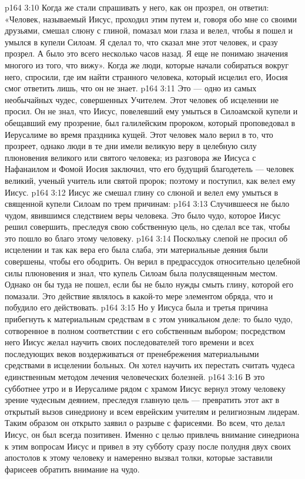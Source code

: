 \vs p164 3:10 Когда же стали спрашивать у него, как он прозрел, он ответил: «Человек, называемый Иисус, проходил этим путем и, говоря обо мне со своими друзьями, смешал слюну с глиной, помазал мои глаза и велел, чтобы я пошел и умылся в купели Силоам. Я сделал то, что сказал мне этот человек, и сразу прозрел. А было это всего несколько часов назад. Я еще не понимаю значения многого из того, что вижу». Когда же люди, которые начали собираться вокруг него, спросили, где им найти странного человека, который исцелил его, Иосия смог ответить лишь, что он не знает.
\vs p164 3:11 \pc Это --- одно из самых необычайных чудес, совершенных Учителем. Этот человек об исцелении не просил. Он не знал, что Иисус, повелевший ему умыться в Силоамской купели и обещавший ему прозрение, был галилейским пророком, который проповедовал в Иерусалиме во время праздника кущей. Этот человек мало верил в то, что прозреет, однако люди в те дни имели великую веру в целебную силу плюновения великого или святого человека; из разговора же Иисуса с Нафанаилом и Фомой Иосия заключил, что его будущий благодетель --- человек великий, ученый учитель или святой пророк; поэтому и поступил, как велел ему Иисус.
\vs p164 3:12 Иисус же смешал глину со слюной и велел ему умыться в священной купели Силоам по трем причинам:
\vs p164 3:13 \bibnobreakspace Случившееся не было чудом, явившимся следствием веры человека. Это было чудо, которое Иисус решил совершить, преследуя свою собственную цель, но сделал все так, чтобы это пошло во благо этому человеку.
\vs p164 3:14 \pc {}\bibnobreakspace Поскольку слепой не просил об исцелении и так как вера его была слаба, эти материальные деяния были совершены, чтобы его ободрить. Он верил в предрассудок относительно целебной силы плюновения и знал, что купель Силоам была полусвященным местом. Однако он бы туда не пошел, если бы не было нужды смыть глину, которой его помазали. Это действие являлось в какой\hyp{}то мере элементом обряда, что и побудило его действовать.
\vs p164 3:15 \pc {}\bibnobreakspace Но у Иисуса была и третья причина прибегнуть к материальным средствам в с этом уникальном деле: то было чудо, сотворенное в полном соответствии с его собственным выбором; посредством него Иисус желал научить своих последователей того времени и всех последующих веков воздерживаться от пренебрежения материальными средствами в исцелении больных. Он хотел научить их перестать считать чудеса единственным методом лечения человеческих болезней.
\vs p164 3:16 \pc В это субботнее утро и в Иерусалиме рядом с храмом Иисус вернул этому человеку зрение чудесным деянием, преследуя главную цель --- превратить этот акт в открытый вызов синедриону и всем еврейским учителям и религиозным лидерам. Таким образом он открыто заявил о разрыве с фарисеями. Во всем, что делал Иисус, он был всегда позитивен. Именно с целью привлечь внимание синедриона к этим вопросам Иисус и привел в эту субботу сразу после полудня двух своих апостолов к этому человеку и намеренно вызвал толки, которые заставили фарисеев обратить внимание на чудо.
